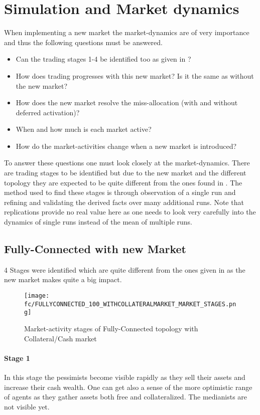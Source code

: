 \documentclass[Bachelorarbeit.tex]{subfiles}
\begin{document}
\section{Simulation and Market dynamics}
When implementing a new market the market-dynamics are of very importance and thus the following questions must be answered.

\begin{itemize}
\item Can the trading stages 1-4 be identified too as given in \cite{Breuer2015}?
\item How does trading progresses with this new market? Is it the same as without the new market?
\item How does the new market resolve the miss-allocation (with and without deferred activation)?
\item When and how much is each market active? 
\item How do the market-activities change when a new market is introduced?
\end{itemize}

To answer these questions one must look closely at the market-dynamics. There are trading stages to be identified but due to the new market and the different topology they are expected to be quite different from the ones found in \cite{Breuer2015}. The method used to find these stages is through observation of a single run and refining and validating the derived facts over many additional runs. Note that replications provide no real value here as one needs to look very carefully into the dynamics of single runs instead of the mean of multiple runs.

\subsection{Fully-Connected with new Market}

4 Stages were identified which are quite different from the ones given in \cite{Breuer2015} as the new market makes quite a big impact.

\begin{figure}[H]
	\centering
  \texttt{[image: fc/FULLYCONNECTED\_100\_WITHCOLLATERALMARKET\_MARKET\_STAGES.png]}
  	\caption{Market-activity stages of Fully-Connected topology with Collateral/Cash market}
	\label{fig:markets_FULLYCONNECTED_100_WITHCOLLATERALMARKET_MARKET_STAGES}
\end{figure}

\paragraph{Stage 1}
In this stage the pessimists become visible rapidly as they sell their assets and increase their cash wealth. One can get also a sense of the more optimistic range of agents as they gather assets both free and collateralized. The medianists are not visible yet.
\end{document}
